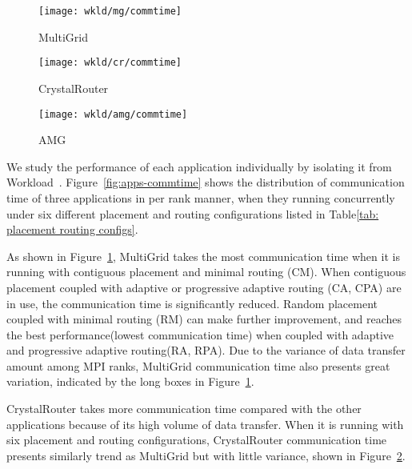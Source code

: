 \begin{figure*}[t!]
    \centering
    \begin{subfigure}[t]{0.32\textwidth}
        \centering
        \texttt{[image: wkld/mg/commtime]}
        \caption{MultiGrid}
        \label{fig:mg-commtime}
    \end{subfigure}%
    \hspace{1em}%
    \begin{subfigure}[t]{0.32\textwidth}
        \centering
        \texttt{[image: wkld/cr/commtime]}
        \caption{CrystalRouter}
        \label{fig:cr-commtime}
    \end{subfigure}%
    \hspace{1em}%
    \begin{subfigure}[t]{0.32\textwidth}
        \centering
        \texttt{[image: wkld/amg/commtime]}
        \caption{AMG}
        \label{fig:amg-commtime}
    \end{subfigure}%
    \caption{The communication time of all ranks in each application. Random placement and adaptive routing can improve the communication time of MultiGrid and CrystalRouter, while AMG's communication time is greatly prolonged.}
   \label{fig:apps-commtime}
\end{figure*}



We study the performance of each application individually by isolating it from Workload~.   
Figure~\ref{fig:apps-commtime} shows the distribution of communication time of three applications in per rank manner, when they running concurrently under six different placement and routing configurations listed in Table\ref{tab: placement routing configs}.

As shown in Figure~\ref{fig:mg-commtime}, MultiGrid takes the most communication time when it is running with contiguous placement and minimal routing (CM). When contiguous placement coupled with adaptive or progressive adaptive routing (CA, CPA) are in use, the communication time is significantly reduced. Random placement coupled with minimal routing (RM) can make further improvement, and reaches the best performance(lowest communication time) when coupled with adaptive and progressive adaptive routing(RA, RPA). Due to the variance of data transfer amount among MPI ranks, MultiGrid communication time also presents great variation, indicated by the long boxes in Figure~\ref{fig:mg-commtime}.

CrystalRouter takes more communication time compared with the other applications because of its high volume of data transfer. When it is running with six placement and routing configurations, 
CrystalRouter communication time presents similarly trend as MultiGrid but with little variance, shown in Figure~\ref{fig:cr-commtime}. 


